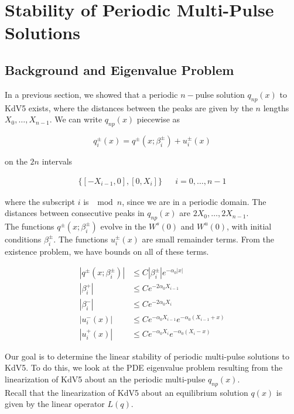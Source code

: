 \documentclass[12pt]{article}
\begin{document}
\section{Stability of Periodic Multi-Pulse Solutions}

\subsection{Background and Eigenvalue Problem}

In a previous section, we showed that a periodic $n-$pulse solution $q_{np}(x)$ to KdV5 exists, where the distances between the peaks are given by the $n$ lengths $X_0, \dots, X_{n-1}$. We can write $q_{np}(x)$ piecewise as

\[
q_i^\pm(x) = q^\pm(x; \beta_i^\pm) + u_i^\pm(x)
\]

on the $2n$ intervals 

\begin{align*}
\{ [-X_{i-1}, 0], [0, X_i] \} && i = 0, \dots, n-1
\end{align*}

where the subscript $i$ is $\mod n$, since we are in a periodic domain. The distances between consecutive peaks in $q_{np}(x)$ are $2 X_0, \dots, 2 X_{n-1}$.\\

The functions $q^\pm(x; \beta_i^\pm)$ evolve in the $W^s(0)$ and $W^u(0)$, with initial conditions $\beta_i^\pm$. The functions $u_i^\pm(x)$ are small remainder terms. From the existence problem, we have bounds on all of these terms.

\begin{align*}
|q^\pm(x; \beta_i^\pm)| &\leq C |\beta_i^\pm| e^{-\alpha_0 |x|} \\
|\beta_i^+| &\leq C e^{-2 \alpha_0 X_{i-1}} \\
|\beta_i^-| &\leq C e^{-2 \alpha_0 X_i} \\
|u_i^-(x)| &\leq C e^{-\alpha_0 X_{i-1}} e^{-\alpha_0(X_{i-1} + x) } \\
|u_i^+(x)| &\leq C e^{-\alpha_0 X_i} e^{-\alpha_0(X_i - x) } 
\end{align*}

Our goal is to determine the linear stability of periodic multi-pulse solutions to KdV5. To do this, we look at the PDE eigenvalue problem resulting from the linearization of KdV5 about an the periodic multi-pulse $q_{np}(x)$.\\

Recall that the linearization of KdV5 about an equilibrium solution $q(x)$ is given by the linear operator $L(q)$.
\end{document}
